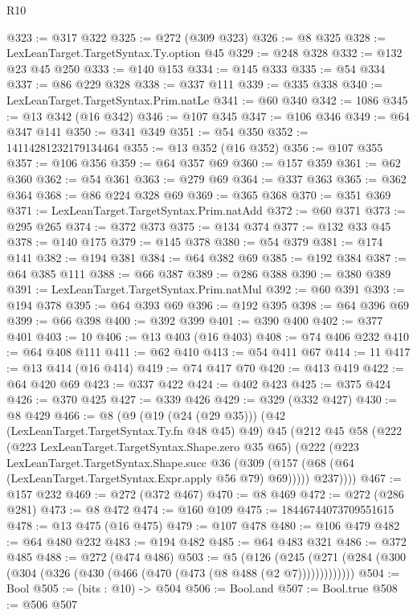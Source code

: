 \begin{lexlean}{R10}
\begin{coremodule}
@323 := @317 @322
@325 := @272 (@309 @323)
@326 := @8 @325
@328 := LexLeanTarget.TargetSyntax.Ty.option @45
@329 := @248 @328
@332 := @132 @23 @45 @250
@333 := @140 @153
@334 := @145 @333
@335 := @54 @334
@337 := @86 @229 @328
@338 := @337 @111
@339 := @335 @338
@340 := LexLeanTarget.TargetSyntax.Prim.natLe
@341 := @60 @340
@342 := 1086
@345 := @13 @342 (@16 @342)
@346 := @107 @345
@347 := @106 @346
@349 := @64 @347 @141
@350 := @341 @349
@351 := @54 @350
@352 := 14114281232179134464
@355 := @13 @352 (@16 @352)
@356 := @107 @355
@357 := @106 @356
@359 := @64 @357 @69
@360 := @157 @359
@361 := @62 @360
@362 := @54 @361
@363 := @279 @69
@364 := @337 @363
@365 := @362 @364
@368 := @86 @224 @328 @69
@369 := @365 @368
@370 := @351 @369
@371 := LexLeanTarget.TargetSyntax.Prim.natAdd
@372 := @60 @371
@373 := @295 @265
@374 := @372 @373
@375 := @134 @374
@377 := @132 @33 @45
@378 := @140 @175
@379 := @145 @378
@380 := @54 @379
@381 := @174 @141
@382 := @194 @381
@384 := @64 @382 @69
@385 := @192 @384
@387 := @64 @385 @111
@388 := @66 @387
@389 := @286 @388
@390 := @380 @389
@391 := LexLeanTarget.TargetSyntax.Prim.natMul
@392 := @60 @391
@393 := @194 @378
@395 := @64 @393 @69
@396 := @192 @395
@398 := @64 @396 @69
@399 := @66 @398
@400 := @392 @399
@401 := @390 @400
@402 := @377 @401
@403 := 10
@406 := @13 @403 (@16 @403)
@408 := @74 @406 @232
@410 := @64 @408 @111
@411 := @62 @410
@413 := @54 @411 @67
@414 := 11
@417 := @13 @414 (@16 @414)
@419 := @74 @417 @70
@420 := @413 @419
@422 := @64 @420 @69
@423 := @337 @422
@424 := @402 @423
@425 := @375 @424
@426 := @370 @425
@427 := @339 @426
@429 := @329 (@332 @427)
@430 := @8 @429
@466 := @8
    (@9
      (@19 (@24 (@29 @35)))
      (@42 (LexLeanTarget.TargetSyntax.Ty.fn @48 @45) @49)
      @45
      (@212
        @45
        @58
        (@222
          (@223 LexLeanTarget.TargetSyntax.Shape.zero @35 @65)
          (@222
            (@223
              LexLeanTarget.TargetSyntax.Shape.succ
              @36
              (@309 (@157 (@68 (@64 (LexLeanTarget.TargetSyntax.Expr.apply @56 @79) @69)))))
            @237))))
@467 := @157 @232
@469 := @272 (@372 @467)
@470 := @8 @469
@472 := @272 (@286 @281)
@473 := @8 @472
@474 := @160 @109
@475 := 18446744073709551615
@478 := @13 @475 (@16 @475)
@479 := @107 @478
@480 := @106 @479
@482 := @64 @480 @232
@483 := @194 @482
@485 := @64 @483 @321
@486 := @372 @485
@488 := @272 (@474 @486)
@503 := @5
    (@126 (@245 (@271 (@284 (@300 (@304 (@326 (@430 (@466 (@470 (@473 (@8 @488 (@2 @7)))))))))))))
@504 := Bool
@505 := (bits : @10) -> @504
@506 := Bool.and
@507 := Bool.true
@508 := @506 @507

\end{coremodule}
\end{lexlean}
